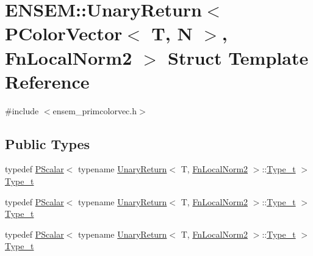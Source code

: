 \hypertarget{structENSEM_1_1UnaryReturn_3_01PColorVector_3_01T_00_01N_01_4_00_01FnLocalNorm2_01_4}{}\section{E\+N\+S\+EM\+:\+:Unary\+Return$<$ P\+Color\+Vector$<$ T, N $>$, Fn\+Local\+Norm2 $>$ Struct Template Reference}
\label{structENSEM_1_1UnaryReturn_3_01PColorVector_3_01T_00_01N_01_4_00_01FnLocalNorm2_01_4}


{\ttfamily \#include $<$ensem\+\_\+primcolorvec.\+h$>$}

\subsection*{Public Types}
\begin{DoxyCompactItemize}
\item 
typedef \mbox{\hyperlink{classENSEM_1_1PScalar}{P\+Scalar}}$<$ typename \mbox{\hyperlink{structENSEM_1_1UnaryReturn}{Unary\+Return}}$<$ T, \mbox{\hyperlink{structENSEM_1_1FnLocalNorm2}{Fn\+Local\+Norm2}} $>$\+::\mbox{\hyperlink{structENSEM_1_1UnaryReturn_3_01PColorVector_3_01T_00_01N_01_4_00_01FnLocalNorm2_01_4_ae0b040392de6e5320e94c74d9578abb8}{Type\+\_\+t}} $>$ \mbox{\hyperlink{structENSEM_1_1UnaryReturn_3_01PColorVector_3_01T_00_01N_01_4_00_01FnLocalNorm2_01_4_ae0b040392de6e5320e94c74d9578abb8}{Type\+\_\+t}}
\item 
typedef \mbox{\hyperlink{classENSEM_1_1PScalar}{P\+Scalar}}$<$ typename \mbox{\hyperlink{structENSEM_1_1UnaryReturn}{Unary\+Return}}$<$ T, \mbox{\hyperlink{structENSEM_1_1FnLocalNorm2}{Fn\+Local\+Norm2}} $>$\+::\mbox{\hyperlink{structENSEM_1_1UnaryReturn_3_01PColorVector_3_01T_00_01N_01_4_00_01FnLocalNorm2_01_4_ae0b040392de6e5320e94c74d9578abb8}{Type\+\_\+t}} $>$ \mbox{\hyperlink{structENSEM_1_1UnaryReturn_3_01PColorVector_3_01T_00_01N_01_4_00_01FnLocalNorm2_01_4_ae0b040392de6e5320e94c74d9578abb8}{Type\+\_\+t}}
\item 
typedef \mbox{\hyperlink{classENSEM_1_1PScalar}{P\+Scalar}}$<$ typename \mbox{\hyperlink{structENSEM_1_1UnaryReturn}{Unary\+Return}}$<$ T, \mbox{\hyperlink{structENSEM_1_1FnLocalNorm2}{Fn\+Local\+Norm2}} $>$\+::\mbox{\hyperlink{structENSEM_1_1UnaryReturn_3_01PColorVector_3_01T_00_01N_01_4_00_01FnLocalNorm2_01_4_ae0b040392de6e5320e94c74d9578abb8}{Type\+\_\+t}} $>$ \mbox{\hyperlink{structENSEM_1_1UnaryReturn_3_01PColorVector_3_01T_00_01N_01_4_00_01FnLocalNorm2_01_4_ae0b040392de6e5320e94c74d9578abb8}{Type\+\_\+t}}
\end{DoxyCompactItemize}


